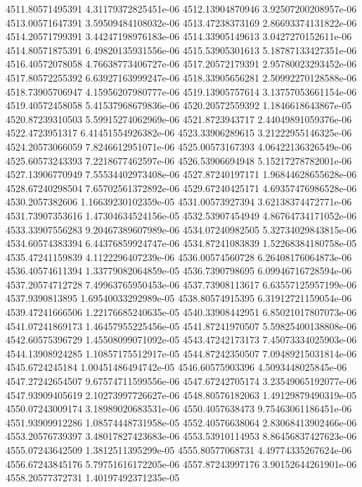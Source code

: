 {4511.80571495391 4.31179372825451e-06
4512.13904870946 3.92507200208957e-06
4513.00571647391 3.59509484108032e-06
4513.47238373169 2.86693374131822e-06
4514.20571799391 3.44247198976183e-06
4514.33905149613 3.0427270152611e-06
4514.80571875391 6.49820135931556e-06
4515.53905301613 5.18787133427351e-06
4516.40572078058 4.76638773406727e-06
4517.20572179391 2.95780023293452e-06
4517.80572255392 6.63927163999247e-06
4518.33905656281 2.50992270128588e-06
4518.73905706947 4.15956207980777e-06
4519.13905757614 3.13757053661154e-06
4519.40572458058 5.41537968679836e-06
4520.20572559392 1.1846618643867e-05
4520.87239310503 5.59915274062969e-06
4521.8723943717 2.44049891059376e-06
4522.4723951317 6.41451554926382e-06
4523.33906289615 3.21222955146325e-06
4524.20573066059 7.8246612951071e-06
4525.00573167393 4.06422136326549e-06
4525.60573243393 7.2218677462597e-06
4526.53906694948 5.15217278782001e-06
4527.13906770949 7.55534402973408e-06
4527.87240197171 1.96844628655628e-06
4528.67240298504 7.65702561372892e-06
4529.67240425171 4.69357476986528e-06
4530.2057382606 1.16639230102359e-05
4531.00573927394 3.62138374472771e-06
4531.73907353616 1.47304634524156e-05
4532.53907454949 4.86764734171052e-06
4533.33907556283 9.20467389607989e-06
4534.07240982505 5.32734029843815e-06
4534.60574383394 6.44376859924747e-06
4534.87241083839 1.52268384180758e-05
4535.47241159839 4.1122296407239e-06
4536.00574560728 6.26408176064873e-06
4536.40574611394 1.33779082064859e-05
4536.7390798695 6.09946716728594e-06
4537.20574712728 7.49963765950453e-06
4537.73908113617 6.63557125957199e-06
4537.9390813895 1.69540033292989e-05
4538.80574915395 6.31912721159054e-06
4539.47241666506 1.22176685240635e-05
4540.33908442951 6.85021017807073e-06
4541.07241869173 1.46457955225456e-05
4541.87241970507 5.59825400138808e-06
4542.60575396729 1.45508099071092e-05
4543.47242173173 7.45073334025903e-06
4544.13908924285 1.10857175512917e-05
4544.87242350507 7.09489215031814e-06
4545.6724245184 1.00451486494742e-05
4546.60575903396 4.5093448025845e-06
4547.27242654507 9.67574711599556e-06
4547.67242705174 3.23549065192077e-06
4547.93909405619 2.10273997726627e-06
4548.80576182063 1.49129879490319e-05
4550.07243009174 3.18989020683531e-06
4550.4057638473 9.75463061186451e-06
4551.93909912286 1.08574448731958e-05
4552.40576638064 2.83068413902466e-06
4553.20576739397 3.48017827423683e-06
4553.53910114953 8.86456837427623e-06
4555.07243642509 1.3812511395299e-05
4555.80577068731 4.49774335267624e-06
4556.67243845176 5.79751616172205e-06
4557.87243997176 3.90152644261901e-06
4558.20577372731 1.40197492371235e-05
}
